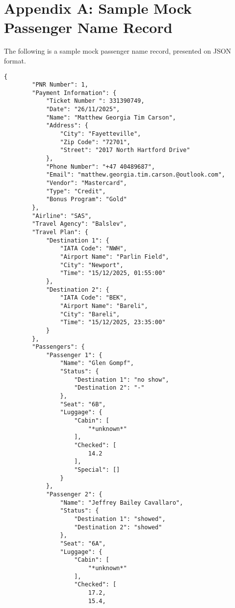 \section*{Appendix A: Sample Mock Passenger Name Record}
\label{apx:mockrecord}

The following is a sample mock passenger name record, presented on JSON format.

\begin{lstlisting}[basicstyle=\scriptsize]
    {
        "PNR Number": 1,
        "Payment Information": {
            "Ticket Number ": 331390749,
            "Date": "26/11/2025",
            "Name": "Matthew Georgia Tim Carson",
            "Address": {
                "City": "Fayetteville",
                "Zip Code": "72701",
                "Street": "2017 North Hartford Drive"
            },
            "Phone Number": "+47 40489687",
            "Email": "matthew.georgia.tim.carson.@outlook.com",
            "Vendor": "Mastercard",
            "Type": "Credit",
            "Bonus Program": "Gold"
        },
        "Airline": "SAS",
        "Travel Agency": "Balslev",
        "Travel Plan": {
            "Destination 1": {
                "IATA Code": "NWH",
                "Airport Name": "Parlin Field",
                "City": "Newport",
                "Time": "15/12/2025, 01:55:00"
            },
            "Destination 2": {
                "IATA Code": "BEK",
                "Airport Name": "Bareli",
                "City": "Bareli",
                "Time": "15/12/2025, 23:35:00"
            }
        },
        "Passengers": {
            "Passenger 1": {
                "Name": "Glen Gompf",
                "Status": {
                    "Destination 1": "no show",
                    "Destination 2": "-"
                },
                "Seat": "6B",
                "Luggage": {
                    "Cabin": [
                        "*unknown*"
                    ],
                    "Checked": [
                        14.2
                    ],
                    "Special": []
                }
            },
            "Passenger 2": {
                "Name": "Jeffrey Bailey Cavallaro",
                "Status": {
                    "Destination 1": "showed",
                    "Destination 2": "showed"
                },
                "Seat": "6A",
                "Luggage": {
                    "Cabin": [
                        "*unknown*"
                    ],
                    "Checked": [
                        17.2,
                        15.4,

\end{lstlisting}
